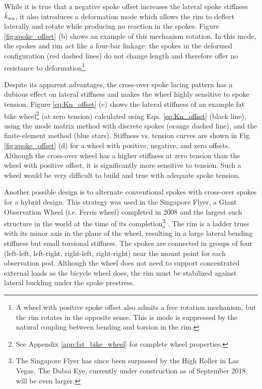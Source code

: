 \documentclass[\rootdir/thesis.tex]{subfiles}
\begin{document}
While it is true that a negative spoke offset increases the lateral spoke stiffness $\bar{k}_{uu}$, it also introduces a deformation mode which allows the rim to deflect laterally and rotate while producing no reaction in the spokes. Figure \ref{fig:spoke_offset} (b) shows an example of this mechanism rotation. In this mode, the spokes and rim act like a four-bar linkage: the spokes in the deformed configuration (red dashed lines) do not change length and therefore offer no resistance to deformation\footnote{A wheel with positive spoke offset also admits a free rotation mechanism, but the rim rotates in the opposite sense. This is mode is suppressed by the natural coupling between bending and torsion in the rim.}.

Despite its apparent advantages, the cross-over spoke lacing pattern has a dubious effect on lateral stiffness and makes the wheel highly sensitive to spoke tension. Figure \ref{eq:Kn_offset} (c) shows the lateral stiffness of an example fat bike wheel\footnote{See Appendix \ref{app:fat_bike_wheel} for complete wheel properties.} (at zero tension) calculated using Eqn. \eqref{eq:Kn_offset} (black line), using the mode matrix method with discrete spokes (orange dashed line), and the finite-element method (blue stars). Stiffness vs. tension curves are shown in Fig. \ref{fig:spoke_offset} (d) for a wheel with positive, negative, and zero offsets. Although the cross-over wheel has a higher stiffness at zero tension than the wheel with positive offset, it is significantly more sensitive to tension. Such a wheel would be very difficult to build and true with adequate spoke tension.

Another possible design is to alternate conventional spokes with cross-over spokes for a hybrid design. This strategy was used in the Singapore Flyer, a Giant Observation Wheel (i.e. Ferris wheel) completed in 2008 and the largest such structure in the world at the time of its completion\footnote{The Singapore Flyer has since been surpassed by the High Roller in Las Vegas. The Dubai Eye, currently under construction as of September 2018, will be even larger.} \cite{Allsop2009}. The rim is a ladder truss with its minor axis in the plane of the wheel, resulting in a large lateral bending stiffness but small torsional stiffness. The spokes are connected in groups of four (left-left, left-right, right-left, right-right) near the mount point for each observation pod. Although the wheel does not need to support concentrated external loads as the bicycle wheel does, the rim must be stabilized against lateral buckling under the spoke prestress.
\end{document}
